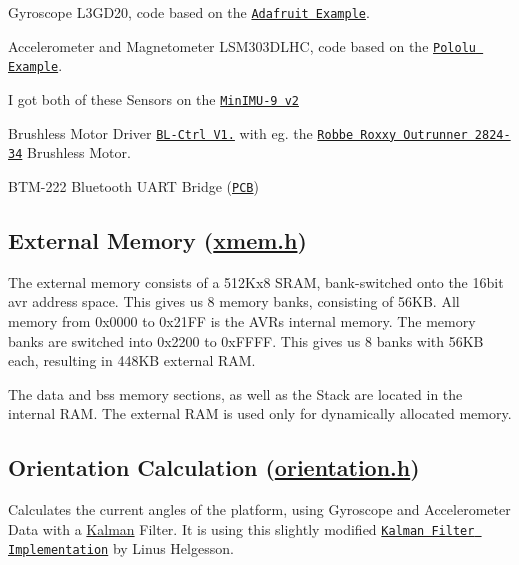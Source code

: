 \begin{DoxyItemize}
\item Gyroscope L3\-G\-D20, code based on the \href{https://github.com/adafruit/Adafruit_L3GD20}{\tt Adafruit Example}.
\item Accelerometer and Magnetometer L\-S\-M303\-D\-L\-H\-C, code based on the \href{https://github.com/pololu/LSM303}{\tt Pololu Example}.
\item I got both of these Sensors on the \href{http://www.pololu.com/catalog/product/1268}{\tt Min\-I\-M\-U-\/9 v2}
\item Brushless Motor Driver \href{http://www.mikrokopter.de/ucwiki/en/BL-Ctrl_V1.2}{\tt B\-L-\/\-Ctrl V1.} with eg. the \href{http://www.conrad.de/ce/de/product/231867}{\tt Robbe Roxxy Outrunner 2824-\/34} Brushless Motor.
\item B\-T\-M-\/222 Bluetooth U\-A\-R\-T Bridge (\href{http://xythobuz.org/index.php?p=bt}{\tt P\-C\-B})
\end{DoxyItemize}

\subsection*{External Memory (\hyperlink{xmem_8h}{xmem.\-h})}

The external memory consists of a 512\-Kx8 S\-R\-A\-M, bank-\/switched onto the 16bit avr address space. This gives us 8 memory banks, consisting of 56\-K\-B. All memory from 0x0000 to 0x21\-F\-F is the A\-V\-Rs internal memory. The memory banks are switched into 0x2200 to 0x\-F\-F\-F\-F. This gives us 8 banks with 56\-K\-B each, resulting in 448\-K\-B external R\-A\-M.

The data and bss memory sections, as well as the Stack are located in the internal R\-A\-M. The external R\-A\-M is used only for dynamically allocated memory.

\subsection*{Orientation Calculation (\hyperlink{orientation_8h}{orientation.\-h})}

Calculates the current angles of the platform, using Gyroscope and Accelerometer Data with a \hyperlink{struct_kalman}{Kalman} Filter. It is using this slightly modified \href{http://www.linushelgesson.se/2012/04/pitch-and-roll-estimating-kalman-filter-for-stabilizing-quadrocopters/}{\tt Kalman Filter Implementation} by Linus Helgesson.

